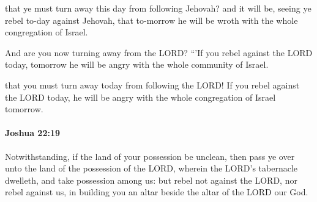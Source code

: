			\begin{versebox}
					\item[BHS] 
					\item[ASV] that ye must turn away this day from following Jehovah? and it will be, seeing ye rebel to-day against Jehovah, that to-morrow he will be wroth with the whole congregation of Israel.
					\item[NIV] And are you now turning away from the LORD? “’If you rebel against the LORD today, tomorrow he will be angry with the whole community of Israel.
					\item[NRSV] that you must turn away today from following the LORD! If you rebel against the LORD today, he will be angry with the whole congregation of Israel tomorrow.
			\end{versebox}

		\paragraph{Joshua 22:19} %
			\label{JOSHUA-22-19}

			Notwithstanding, if the land of your possession be unclean, then pass ye over unto the land of the possession of the LORD, wherein the LORD’s tabernacle dwelleth, and take possession among us: but rebel not against the LORD, nor rebel against us, in building you an altar beside the altar of the LORD our God.

